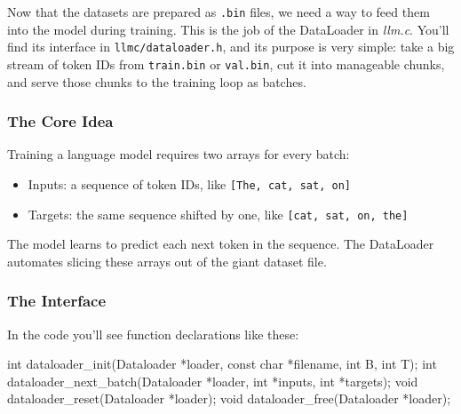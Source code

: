 \documentclass[
  letterpaper,
  DIV=11,
  numbers=noendperiod]{scrreprt}
\newenvironment{Shaded}{\begin{snugshade}}{\end{snugshade}}
\newcommand{\DataTypeTok}[1]{\textcolor[rgb]{0.68,0.00,0.00}{#1}}
\newcommand{\NormalTok}[1]{\textcolor[rgb]{0.00,0.23,0.31}{#1}}
\newcommand{\OperatorTok}[1]{\textcolor[rgb]{0.37,0.37,0.37}{#1}}
\providecommand{\tightlist}{%
  \setlength{\itemsep}{0pt}\setlength{\parskip}{0pt}}
\begin{document}
Now that the datasets are prepared as \texttt{.bin} files, we need a way
to feed them into the model during training. This is the job of the
DataLoader in \emph{llm.c}. You'll find its interface in
\texttt{llmc/dataloader.h}, and its purpose is very simple: take a big
stream of token IDs from \texttt{train.bin} or \texttt{val.bin}, cut it
into manageable chunks, and serve those chunks to the training loop as
batches.

\subsubsection{The Core Idea}\label{the-core-idea}

Training a language model requires two arrays for every batch:

\begin{itemize}
\tightlist
\item
  Inputs: a sequence of token IDs, like
  \texttt{{[}The,\ cat,\ sat,\ on{]}}
\item
  Targets: the same sequence shifted by one, like
  \texttt{{[}cat,\ sat,\ on,\ the{]}}
\end{itemize}

The model learns to predict each next token in the sequence. The
DataLoader automates slicing these arrays out of the giant dataset file.

\subsubsection{The Interface}\label{the-interface}

In the code you'll see function declarations like these:

\begin{Shaded}
\begin{Highlighting}[]
\DataTypeTok{int}\NormalTok{ dataloader\_init}\OperatorTok{(}\NormalTok{Dataloader }\OperatorTok{*}\NormalTok{loader}\OperatorTok{,} \DataTypeTok{const} \DataTypeTok{char} \OperatorTok{*}\NormalTok{filename}\OperatorTok{,} \DataTypeTok{int}\NormalTok{ B}\OperatorTok{,} \DataTypeTok{int}\NormalTok{ T}\OperatorTok{);}
\DataTypeTok{int}\NormalTok{ dataloader\_next\_batch}\OperatorTok{(}\NormalTok{Dataloader }\OperatorTok{*}\NormalTok{loader}\OperatorTok{,} \DataTypeTok{int} \OperatorTok{*}\NormalTok{inputs}\OperatorTok{,} \DataTypeTok{int} \OperatorTok{*}\NormalTok{targets}\OperatorTok{);}
\DataTypeTok{void}\NormalTok{ dataloader\_reset}\OperatorTok{(}\NormalTok{Dataloader }\OperatorTok{*}\NormalTok{loader}\OperatorTok{);}
\DataTypeTok{void}\NormalTok{ dataloader\_free}\OperatorTok{(}\NormalTok{Dataloader }\OperatorTok{*}\NormalTok{loader}\OperatorTok{);}
\end{Highlighting}
\end{Shaded}
\end{document}
